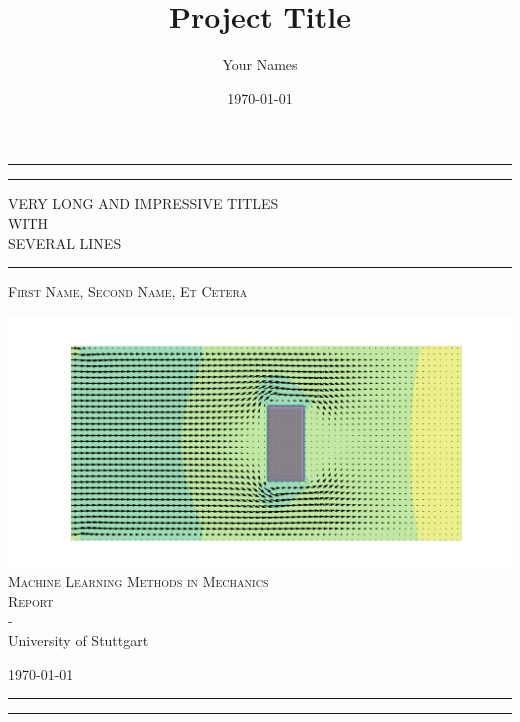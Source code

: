 \documentclass[11pt,table]{article}
\title{Project Title}
\author{Your Names}
\date{\today}
\begin{document}
\begin{titlepage} 
	\centering 
	\rule{\textwidth}{1pt} 
	\vspace{2pt}\vspace{-\baselineskip} 
	\rule{\textwidth}{0.4pt} 
	\vspace{0.1\textheight} 
	
	
	{\Huge VERY LONG AND IMPRESSIVE TITLES}\\[0.5\baselineskip] 
	{\Large WITH}\\[0.5\baselineskip] 
	{\Huge SEVERAL LINES} 
	
	
	\vspace{0.025\textheight} 
	\rule{0.3\textwidth}{0.4pt} 
	\vspace{0.1\textheight}
	
	{\Large \textsc{First Name, Second Name, Et Cetera}} 
	
	\vfill 
	
	\includegraphics[width=0.5\linewidth]{Figures/example_cover.png} \\
	\vspace{0.05\textheight}
	{\large\textsc{Machine Learning Methods in Mechanics \\Report}\\ -\\ University of Stuttgart} 
	
	
	\vspace{0.1\textheight} 
	
	{\normalsize \today}
	
	
	\rule{\textwidth}{0.4pt}
	\vspace{2pt}\vspace{-\baselineskip}
	\rule{\textwidth}{1pt}
	
\end{titlepage}


\newpage

\tableofcontents
\end{document}
